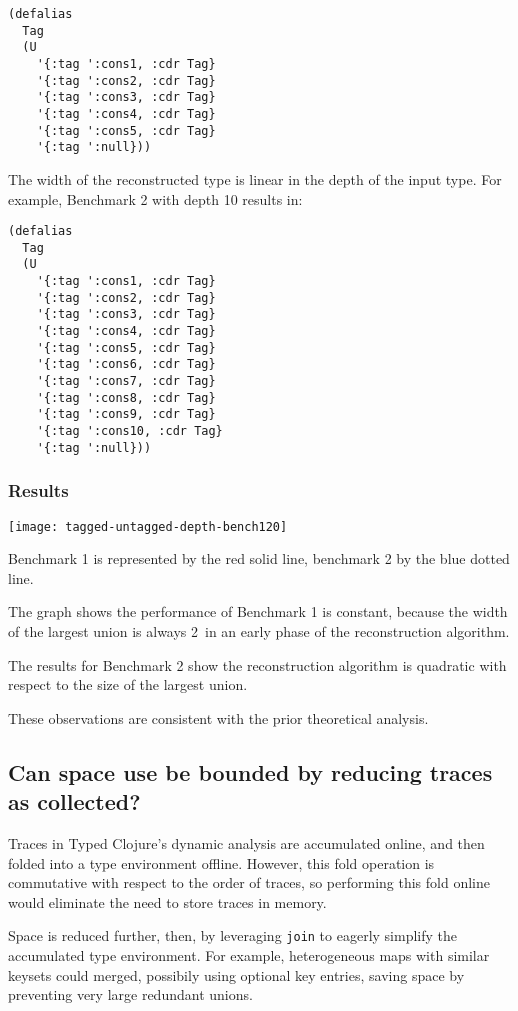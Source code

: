 \begin{verbatim}
(defalias
  Tag
  (U
    '{:tag ':cons1, :cdr Tag}
    '{:tag ':cons2, :cdr Tag}
    '{:tag ':cons3, :cdr Tag}
    '{:tag ':cons4, :cdr Tag}
    '{:tag ':cons5, :cdr Tag}
    '{:tag ':null}))
\end{verbatim}

The width of the reconstructed type is linear in the depth of the input type.
For example, Benchmark 2 with depth 10 results in:

\begin{verbatim}
(defalias
  Tag
  (U
    '{:tag ':cons1, :cdr Tag}
    '{:tag ':cons2, :cdr Tag}
    '{:tag ':cons3, :cdr Tag}
    '{:tag ':cons4, :cdr Tag}
    '{:tag ':cons5, :cdr Tag}
    '{:tag ':cons6, :cdr Tag}
    '{:tag ':cons7, :cdr Tag}
    '{:tag ':cons8, :cdr Tag}
    '{:tag ':cons9, :cdr Tag}
    '{:tag ':cons10, :cdr Tag}
    '{:tag ':null}))
\end{verbatim}

\subsubsection{Results}

\texttt{[image: tagged-untagged-depth-bench120]}

Benchmark 1 is represented by the red solid line, benchmark 2 by the
blue dotted line.

The graph shows the performance of Benchmark 1 is constant, because
the width of the largest union is always 2\ in an early phase of the reconstruction
algorithm.

The results for Benchmark 2 show the reconstruction algorithm is quadratic
with respect to the size of the largest union.

These observations are consistent with the prior theoretical analysis.

\subsection{Can space use be bounded by reducing traces as collected?}

Traces in Typed Clojure's dynamic analysis are accumulated online, and then
folded into a type environment offline. However, this fold operation is commutative
with respect to the order of traces, so performing this fold online would
eliminate the need to store traces in memory.

Space is reduced further, then, by leveraging \texttt{join} to eagerly simplify
the accumulated type environment. For example, heterogeneous maps with similar
keysets could merged, possibily using optional key entries, saving space by
preventing very large redundant unions.

